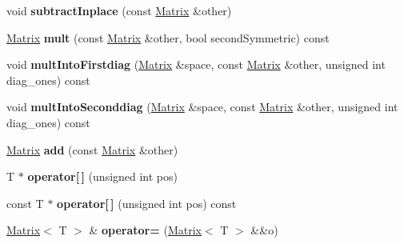 \begin{DoxyCompactItemize}
\item 
\mbox{\label{classcore_1_1_matrix_ade31934c39c85c46444849d067812773}} 
void {\bfseries subtract\+Inplace} (const \mbox{\hyperlink{classcore_1_1_matrix}{Matrix}} \&other)
\item 
\mbox{\label{classcore_1_1_matrix_a6ed28cc5a8c7c06c8f5a1dfdb3b58df6}} 
\mbox{\hyperlink{classcore_1_1_matrix}{Matrix}} {\bfseries mult} (const \mbox{\hyperlink{classcore_1_1_matrix}{Matrix}} \&other, bool second\+Symmetric) const
\item 
\mbox{\label{classcore_1_1_matrix_ad5da63a27aa394d5cd45994fe556f3cc}} 
void {\bfseries mult\+Into\+Firstdiag} (\mbox{\hyperlink{classcore_1_1_matrix}{Matrix}} \&space, const \mbox{\hyperlink{classcore_1_1_matrix}{Matrix}} \&other, unsigned int diag\+\_\+ones) const
\item 
\mbox{\label{classcore_1_1_matrix_ae3073b1391d1f17a242c8da1b70405dc}} 
void {\bfseries mult\+Into\+Seconddiag} (\mbox{\hyperlink{classcore_1_1_matrix}{Matrix}} \&space, const \mbox{\hyperlink{classcore_1_1_matrix}{Matrix}} \&other, unsigned int diag\+\_\+ones) const
\item 
\mbox{\label{classcore_1_1_matrix_af24ac738ad8b0826f8cb735d33b92b59}} 
\mbox{\hyperlink{classcore_1_1_matrix}{Matrix}} {\bfseries add} (const \mbox{\hyperlink{classcore_1_1_matrix}{Matrix}} \&other)
\item 
\mbox{\label{classcore_1_1_matrix_ad0134e59ea31aa3f20f0734108f71d1f}} 
T $\ast$ {\bfseries operator\mbox{[}$\,$\mbox{]}} (unsigned int pos)
\item 
\mbox{\label{classcore_1_1_matrix_a7f3ce1dd749cf3dc2590d9a98baafe5d}} 
const T $\ast$ {\bfseries operator\mbox{[}$\,$\mbox{]}} (unsigned int pos) const
\item 
\mbox{\label{classcore_1_1_matrix_aef608ea918835f84b212db39db0b823d}} 
\mbox{\hyperlink{classcore_1_1_matrix}{Matrix}}$<$ T $>$ \& {\bfseries operator=} (\mbox{\hyperlink{classcore_1_1_matrix}{Matrix}}$<$ T $>$ \&\&o)
\item 

\end{DoxyCompactItemize}
